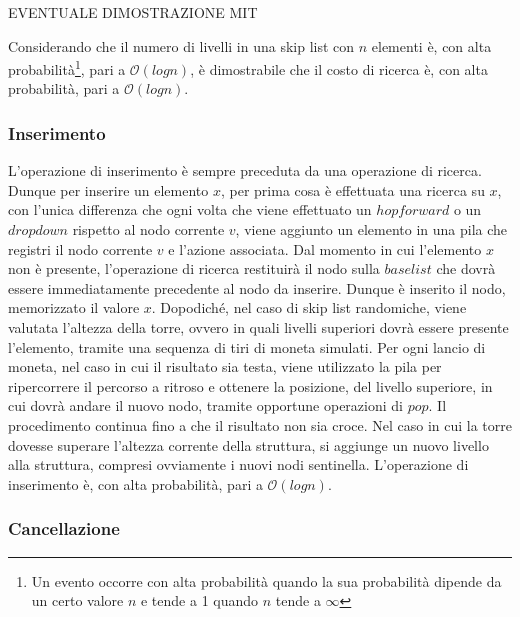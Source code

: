 			{EVENTUALE DIMOSTRAZIONE MIT}
			
			Considerando che il numero di livelli in una skip list con $ n $ elementi è, con alta probabilità\footnote{Un evento occorre con alta probabilità quando la sua probabilità dipende da un certo valore $ n $ e tende a 1 quando $ n $ tende a $\infty$}, pari a $\mathcal{O}(log{}n)$, è dimostrabile che il costo di ricerca è, con alta probabilità, pari a $\mathcal{O}(log{}n)$.
				
		\subsubsection{Inserimento}
		
			L'operazione di inserimento è sempre preceduta da una operazione di ricerca. Dunque per inserire un elemento $ x $, per prima cosa è effettuata una ricerca su $ x $, con l'unica differenza che ogni volta che viene effettuato un $ hop forward $ o un $ drop down $ rispetto al nodo corrente $ v $, viene aggiunto un elemento in una pila che registri il nodo corrente $ v $ e l'azione associata.
			Dal momento in cui l'elemento $ x $ non è presente, l'operazione di ricerca restituirà il nodo sulla $base list$ che dovrà essere immediatamente precedente al nodo da inserire. Dunque è inserito il nodo, memorizzato il valore $ x $. Dopodiché, nel caso di skip list randomiche, viene valutata l'altezza della torre, ovvero in quali livelli superiori dovrà essere presente l'elemento, tramite una sequenza di tiri di moneta simulati. Per ogni lancio di moneta, nel caso in cui il risultato sia testa, viene utilizzato la pila per ripercorrere il percorso a ritroso e ottenere la posizione, del livello superiore, in cui dovrà andare il nuovo nodo, tramite opportune operazioni di $ pop $. Il procedimento continua fino a che il risultato non sia croce. Nel caso in cui la torre dovesse superare l'altezza corrente della struttura, si aggiunge un nuovo livello alla struttura, compresi ovviamente i nuovi nodi sentinella.
			L'operazione di inserimento è, con alta probabilità, pari a $\mathcal{O}(log{}n)$.
		
		\subsubsection{Cancellazione}
		
